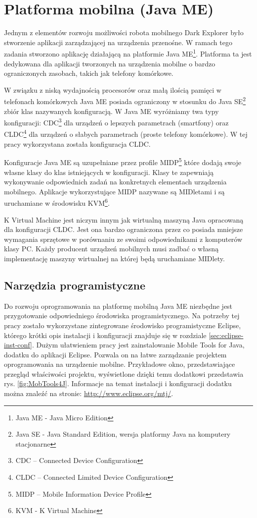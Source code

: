 \section{Platforma mobilna (Java ME)}
\label{sec:javame-app}
Jednym z elementów rozwoju możliwości robota mobilnego Dark Explorer było
stworzenie aplikacji zarządzającej na urządzenia przenośne. W ramach tego zadania
stworzono aplikację działającą na platformie Java ME\footnote{Java ME - Java
Micro Edition}. Platforma ta jest dedykowana dla aplikacji tworzonych na
urządzenia mobilne o bardzo ograniczonych zasobach, takich jak telefony
komórkowe.

W związku z niską wydajnością procesorów oraz małą ilością pamięci w telefonach
komórkowych Java ME posiada ograniczony w stosunku do Java SE\footnote{Java SE -
Java Standard Edition, wersja platformy Java na komputery stacjonarne} zbiór klas
nazywanych konfiguracją. W Java ME wyróżniamy twa typy konfiguracji:
CDC\footnote{CDC -- Connected Device Configuration} dla urządzeń o lepszych
parametrach (smartfony) oraz CLDC\footnote{CLDC -- Connected Limited Device
Configuration} dla urządzeń o słabych parametrach (proste telefony komórkowe). W
tej pracy wykorzystana została konfiguracja CLDC.

Konfiguracje Java ME są uzupełniane przez profile MIDP\footnote{MIDP -- Mobile
Information Device Profile} które dodają swoje własne klasy do klas istniejących
w konfiguracji. Klasy te zapewniają wykonywanie odpowiednich zadań na konkretnych
elementach urządzenia mobilnego. Aplikacje wykorzystujące MIDP nazywane są
MIDletami i są uruchamiane w środowisku KVM\footnote{KVM - K Virtual Machine}.

K Virtual Machine jest niczym innym jak wirtualną maszyną Java opracowaną dla
konfiguracji CLDC. Jest ona bardzo ograniczona przez co posiada mniejsze
wymagania sprzętowe w porównaniu ze swoimi odpowiednikami z komputerów klasy PC.
Każdy producent urządzeń mobilnych musi zadbać o własną implementację maszyny
wirtualnej na której będą uruchamiane MIDlety.

\subsection{Narzędzia programistyczne}
Do rozwoju oprogramowania na platformę mobilną Java ME niezbędne jest
przygotowanie odpowiedniego środowiska programistycznego. Na potrzeby tej pracy
zostało wykorzystane zintegrowane środowisko programistyczne Eclipse, którego
krótki opis instalacji i konfiguracji znajduje się w rozdziale
\ref{sec:eclipse-inst-conf}. Dużym ułatwieniem pracy jest zainstalowanie Mobile
Tools for Java, dodatku do aplikacji Eclipse. Pozwala on na łatwe zarządzanie
projektem oprogramowania na urządzenie mobilne. Przykładowe okno, przedstawiające
przegląd właściwości projektu, wyświetlone dzięki temu dodatkowi przedstawia rys.
\ref{fig:MobTools4J}. Informacje na temat instalacji i konfiguracji dodatku można
znaleźć na stronie: \url{http://www.eclipse.org/mtj/}.

